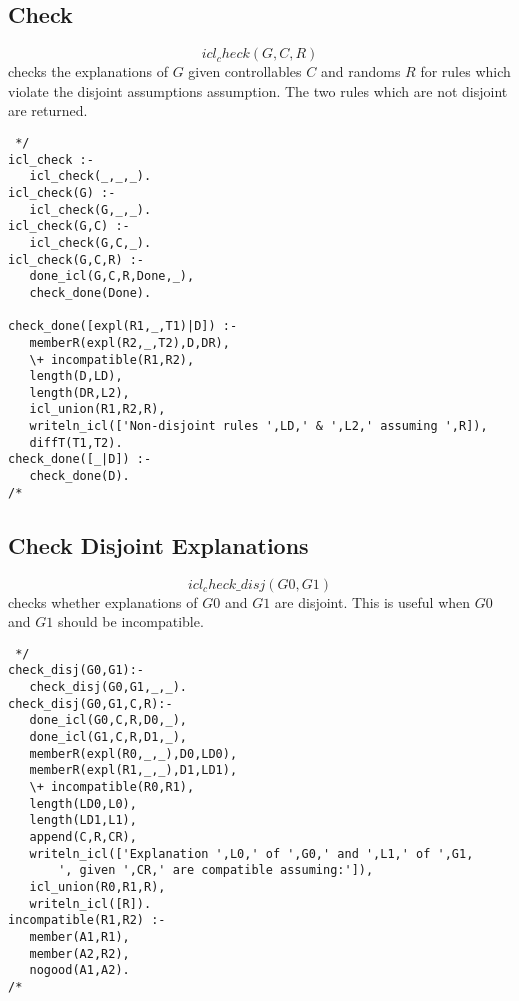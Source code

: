 \documentclass[11pt,fleqn]{article}
\begin{document}
\subsection{Check}
\[icl_check(G,C,R)\] 
checks the explanations of $G$ given controllables $C$ and randoms $R$ 
for rules which violate the disjoint
assumptions assumption. The two rules which are not disjoint are returned.

\begin{verbatim} */
icl_check :- 
   icl_check(_,_,_).
icl_check(G) :-
   icl_check(G,_,_).
icl_check(G,C) :-
   icl_check(G,C,_).
icl_check(G,C,R) :-
   done_icl(G,C,R,Done,_),
   check_done(Done).

check_done([expl(R1,_,T1)|D]) :-
   memberR(expl(R2,_,T2),D,DR),
   \+ incompatible(R1,R2),
   length(D,LD),
   length(DR,L2),
   icl_union(R1,R2,R),
   writeln_icl(['Non-disjoint rules ',LD,' & ',L2,' assuming ',R]),
   diffT(T1,T2).
check_done([_|D]) :-
   check_done(D).
/* \end{verbatim}

\subsection{Check Disjoint Explanations}
\[icl_check\_disj(G0,G1)\] 
checks whether explanations of $G0$ and $G1$ are disjoint. This is useful when $G0$ and $G1$ should be incompatible.
\begin{verbatim} */
check_disj(G0,G1):-
   check_disj(G0,G1,_,_).
check_disj(G0,G1,C,R):-
   done_icl(G0,C,R,D0,_),
   done_icl(G1,C,R,D1,_),
   memberR(expl(R0,_,_),D0,LD0),
   memberR(expl(R1,_,_),D1,LD1),
   \+ incompatible(R0,R1),
   length(LD0,L0),
   length(LD1,L1),
   append(C,R,CR),
   writeln_icl(['Explanation ',L0,' of ',G0,' and ',L1,' of ',G1,
       ', given ',CR,' are compatible assuming:']),
   icl_union(R0,R1,R),
   writeln_icl([R]).
incompatible(R1,R2) :-
   member(A1,R1),
   member(A2,R2),
   nogood(A1,A2).
/* \end{verbatim}
\end{document}
